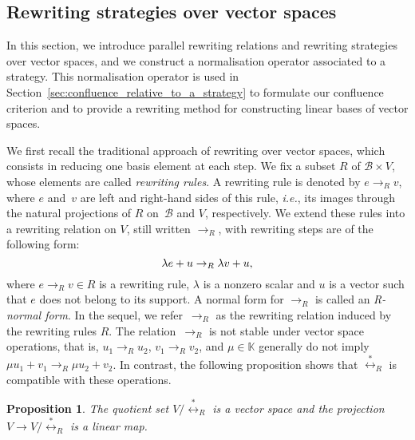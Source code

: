 \documentclass[11pt]{article}
\newtheorem{proposition}[theorem]{Proposition}
\theoremstyle{definition}
\newcommand\ie{\emph{i.e.}}
\newcommand\basis{\mathscr{B}}
\newcommand\K{\mathbb{K}}
\newcommand\rewR{\to_R}
\newcommand\equivR{\overset{*}{\leftrightarrow}_R}
\begin{document}
\subsection{Rewriting strategies over vector spaces}
\label{sec:rewriting_strategies_over_vector_space}

In this section, we introduce parallel rewriting relations and rewriting
strategies over vector spaces, and we construct a normalisation operator
associated to a strategy. This normalisation operator is used in
Section~\ref{sec:confluence_relative_to_a_strategy} to formulate our
confluence criterion and to provide a rewriting method for constructing
linear bases of vector spaces. 
\medskip

We first recall the traditional approach of rewriting over vector spaces,
which consists in reducing one basis element at each step. We fix a
subset $R$ of $\basis\times V$, whose elements are called
{\em rewriting rules}. A rewriting rule is denoted by $e\rewR v$, where
$e$ and~$v$ are left and right-hand sides of this rule, \ie, its images
through the natural projections of $R$  on~$\basis$ and $V$,
respectively. We extend these rules into a rewriting relation on $V$,
still written $\rewR$, with rewriting steps are of the following form: 
\begin{equation}\label{equ:R_rewriting_step}
  \lambda e+u\rewR\lambda v+u,
  \smallskip
\end{equation}
where $e\rewR v\in R$ is a rewriting rule, $\lambda$ is a nonzero scalar
and $u$ is a vector such that $e$ does not belong to its support. A
normal form for $\rewR$ is called an {\em R-normal form}. In the sequel, 
we refer~$\rewR$ as the rewriting relation induced by the rewriting rules
$R$. The relation~$\rewR$ is not stable under vector space
operations, that is, $u_1\rewR u_2$, $v_1\rewR v_2$, and $\mu\in\K$
generally do not imply $\mu u_1+v_1\rewR \mu u_2+v_2$. In contrast, the
following proposition shows that $\equivR$ is compatible with these
operations.
\smallskip

\begin{proposition}\label{prop:vs_structure}
  The quotient set $V/\equivR$ is a vector space and the projection
  $V\to V/\equivR$ is a linear map.
\end{proposition}
\end{document}
